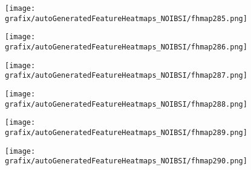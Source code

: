 \hspace{\hsp} 
\begin{subfigure}{\wid\textwidth} 
    \centering 
    \caption{\tiny \sffamily {}} 
    \vspace{\vsp} 
    \texttt{[image: grafix/autoGeneratedFeatureHeatmaps\_NOIBSI/fhmap285.png]} 
\end{subfigure} 
\hspace{\hsp} 
\begin{subfigure}{\wid\textwidth} 
    \centering 
    \caption{\tiny \sffamily {}} 
    \vspace{\vsp} 
    \texttt{[image: grafix/autoGeneratedFeatureHeatmaps\_NOIBSI/fhmap286.png]} 
\end{subfigure} 
\hspace{\hsp} 
\begin{subfigure}{\wid\textwidth} 
    \centering 
    \caption{\tiny \sffamily {}} 
    \vspace{\vsp} 
    \texttt{[image: grafix/autoGeneratedFeatureHeatmaps\_NOIBSI/fhmap287.png]} 
\end{subfigure} 
\hspace{\hsp} 
\begin{subfigure}{\wid\textwidth} 
    \centering 
    \caption{\tiny \sffamily {}} 
    \vspace{\vsp} 
    \texttt{[image: grafix/autoGeneratedFeatureHeatmaps\_NOIBSI/fhmap288.png]} 
\end{subfigure} 
\hspace{\hsp} 
\begin{subfigure}{\wid\textwidth} 
    \centering 
    \caption{\tiny \sffamily {}} 
    \vspace{\vsp} 
    \texttt{[image: grafix/autoGeneratedFeatureHeatmaps\_NOIBSI/fhmap289.png]} 
\end{subfigure} 
\hspace{\hsp} 
\begin{subfigure}{\wid\textwidth} 
    \centering 
    \caption{\tiny \sffamily {}} 
    \vspace{\vsp} 
    \texttt{[image: grafix/autoGeneratedFeatureHeatmaps\_NOIBSI/fhmap290.png]} 
\end{subfigure} 
\hspace{\hsp} 
